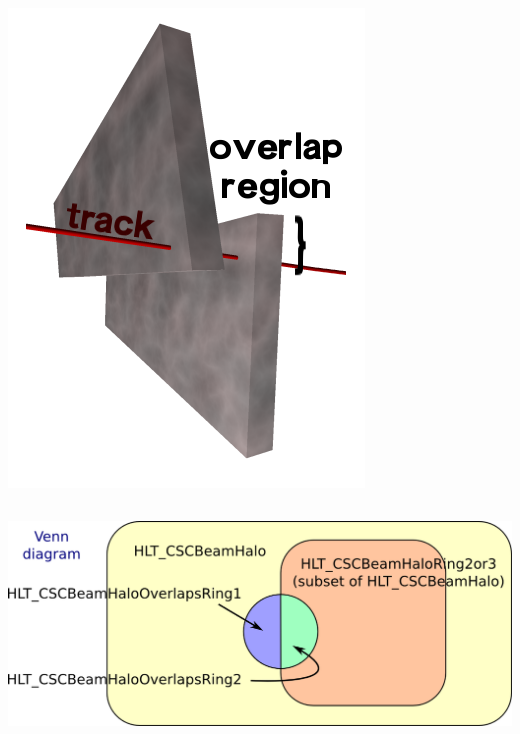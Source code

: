 \documentclass[compress]{beamer}
\begin{document}
\begin{frame}
\begin{columns}
\includegraphics[width=\linewidth]{overlaps.png}
\end{columns}

\begin{center}
\includegraphics[width=0.85\linewidth]{venn_diagram.png}
\end{center}
\end{frame}
\end{document}
